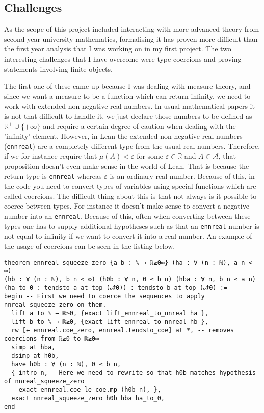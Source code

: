 \documentclass[11pt]{article}
\newenvironment{code}{\captionsetup{type=listing}}{}
\newcommand\R{\mathbb{R}}
\newcommand\A{\mathcal{A}}
\begin{document}
\subsection*{Challenges}

As the scope of this project included interacting with more advanced theory
from second year university mathematics, formalising it has proven more difficult
than the first year analysis that I was working on in my first project. The two
interesting challenges that I have overcome were type coercions and proving
statements involving finite objects.

The first one of these came up because I
was dealing with measure theory, and since we want a measure to be a function which
can return infinity, we need to work with extended non-negative real numbers.
In usual mathematical papers it is not that difficult to handle it, we just declare
those numbers to be defined as $\R^+ \cup \lbrace+\infty\rbrace$ and require a
certain degree of caution when dealing with the 'infinity' element. However, in
Lean the extended non-negative real numbers (\texttt{ennreal}) are a completely
different type from the usual real numbers. Therefore, if we for instance require
that $\mu (A) < \varepsilon $ for some  $\varepsilon \in \R $ and  $A \in \A$, that
proposition doesn't even make sense in the world of Lean. That is because the return
type is \texttt{ennreal} whereas  $\varepsilon$ is an ordinary real number. Because
of this, in the code you need to convert types of variables using special functions
which are called coercions. The difficult thing about this is that not always is
it possible to coerce between types. For instance it doesn't make sense to convert
a negative number into an  \texttt{ennreal}. Because of this, often when converting
between these types one has to supply additional hypotheses such as that an
\texttt{ennreal} number is not equal to infinity if we want to convert it into
a real number. An example of the usage of coercions can be seen in the listing below.
\begin{code}
\begin{verbatim}
theorem ennreal_squeeze_zero {a b : ℕ → ℝ≥0∞} (ha : ∀ (n : ℕ), a n < ∞)
(hb : ∀ (n : ℕ), b n < ∞) (h0b : ∀ n, 0 ≤ b n) (hba : ∀ n, b n ≤ a n)
(ha_to_0 : tendsto a at_top (𝓝0)) : tendsto b at_top (𝓝0) :=
begin -- First we need to coerce the sequences to apply nnreal_squeeze_zero on them.
  lift a to ℕ → ℝ≥0, {exact lift_ennreal_to_nnreal ha },
  lift b to ℕ → ℝ≥0, {exact lift_ennreal_to_nnreal hb },
  rw [← ennreal.coe_zero, ennreal.tendsto_coe] at *, -- removes coercions from ℝ≥0 to ℝ≥0∞
  simp at hba,
  dsimp at h0b,
  have h0b : ∀ (n : ℕ), 0 ≤ b n,
  { intro n,-- Here we need to rewrite so that h0b matches hypothesis of nnreal_squeeze_zero
    exact ennreal.coe_le_coe.mp (h0b n), },
  exact nnreal_squeeze_zero h0b hba ha_to_0,
end
\end{verbatim}
\end{code}
\end{document}
